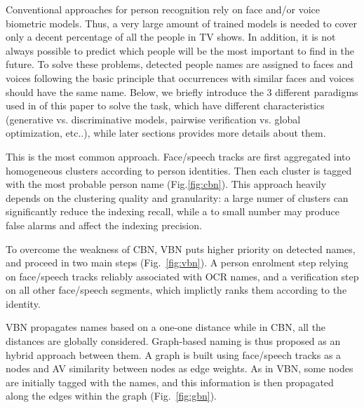 Conventional approaches for person recognition rely on face and/or voice biometric models.
Thus, a very large amount of trained models is needed to cover only a decent percentage of all the people in
TV shows.
%
In addition, it is not always possible to predict which people will be the most important to find in the future.
%
To solve these problems, detected people names are assigned to faces and voices following the basic principle 
that occurrences with similar faces and voices should have the same name.
%
Below, we briefly introduce the 3 different paradigms used in of this paper  to solve the task,
which have different characteristics (generative vs. discriminative models, pairwise verification vs. global optimization, etc..), 
while later sections provides more details about them.
%

 This is the most common approach. Face/speech tracks are first aggregated into homogeneous clusters according to person identities. Then each cluster is tagged with the most probable person name (Fig.\ref{fig:cbn}). 
This approach heavily depends on the  clustering quality and granularity: 
a large numer of clusters can significantly reduce the 
indexing recall, while a to small number may produce false alarms and affect the indexing precision.


 To overcome the weakness of CBN, 
VBN puts higher priority on detected names, and proceed in two main steps (Fig.~\ref{fig:vbn}).
%
A person enrolment step relying on face/speech tracks reliably associated with OCR names, 
and a verification step on all other face/speech segments, which implictly ranks them according to the identity.


VBN propagates names based on a one-one distance while in CBN, all the distances are globally considered. 
Graph-based naming is thus proposed as an hybrid approach between them.
%
A graph is built using  face/speech tracks as a nodes and AV similarity between nodes as edge weights. 
As in VBN, some nodes are initially tagged with the names, and this information is then propagated along the edges 
within the graph (Fig.~\ref{fig:gbn}).


\endinput
